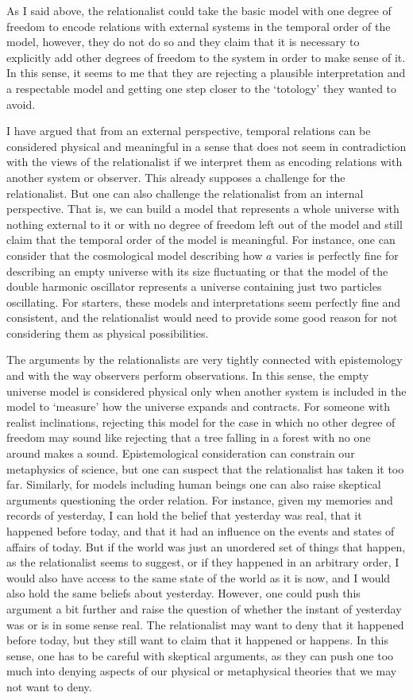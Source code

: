 \documentclass[12 pt]{article}
\begin{document}
As I said above, the relationalist could take the basic model with one degree of freedom to encode relations with external systems in the temporal order of the model, however, they do not do so and they claim that it is necessary to explicitly add other degrees of freedom to the system in order to make sense of it. In this sense, it seems to me that they are rejecting a plausible interpretation and a respectable model and getting one step closer to the `totology' they wanted to avoid.

I have argued that from an external perspective, temporal relations can be considered physical and meaningful in a sense that does not seem in contradiction with the views of the relationalist if we interpret them as encoding relations with another system or observer. This already supposes a challenge for the relationalist. But one can also challenge the relationalist from an internal perspective. That is, we can build a model that represents a whole universe with nothing external to it or with no degree of freedom left out of the model and still claim that the temporal order of the model is meaningful. For instance, one can consider that the cosmological model describing how $a$ varies is perfectly fine for describing an empty universe with its size fluctuating or that the model of the double harmonic oscillator represents a universe containing just two particles oscillating. For starters, these models and interpretations seem perfectly fine and consistent, and the relationalist would need to provide some good reason for not considering them as physical possibilities.

The arguments by the relationalists are very tightly connected with epistemology and with the way observers perform observations. In this sense, the empty universe model is considered physical only when another system is included in the model to `measure' how the universe expands and contracts. For someone with realist inclinations, rejecting this model for the case in which no other degree of freedom may sound like rejecting that a tree falling in a forest with no one around makes a sound. Epistemological consideration can constrain our metaphysics of science, but one can suspect that the relationalist has taken it too far. Similarly, for models including human beings one can also raise skeptical arguments questioning the order relation. For instance, given my memories and records of yesterday, I can hold the belief that yesterday was real, that it happened before today, and that it had an influence on the events and states of affairs of today. But if the world was just an unordered set of things that happen, as the relationalist seems to suggest, or if they happened in an arbitrary order, I would also have access to the same state of the world as it is now, and I would also hold the same beliefs about yesterday. However, one could push this argument a bit further and raise the question of whether the instant of yesterday was or is in some sense real. The relationalist may want to deny that it happened before today, but they still want to claim that it happened or happens. In this sense, one has to be careful with skeptical arguments, as they can push one too much into denying aspects of our physical or metaphysical theories that we may not want to deny.
\end{document}

